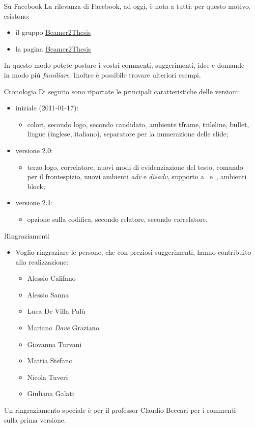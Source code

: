 \begin{tframe}{Su Facebook}
La rilevanza di Facebook, ad oggi, è nota a tutti: per questo motivo, esistono:
\begin{itemize}
\item il gruppo \href{https://www.facebook.com/\#!/groups/beamer2thesis/}{Beamer2Thesis}
\item la pagina \href{https://www.facebook.com/\#!/pages/Beamer2Thesis/112814205489099}{Beamer2Thesis}
\end{itemize} 
In questo modo potete postare i vostri commenti, suggerimenti, idee e domande in modo più \emph{familiare}. Inoltre è possibile trovare ulteriori esempi.
\end{tframe}

\begin{tframe}{Cronologia}
Di seguito sono riportate le principali caratteristiche delle versioni:
\begin{itemize}
\item iniziale (2011-01-17):
\begin{itemize}
\item colori, secondo logo, secondo candidato, ambiente tframe, titleline, bullet, lingue (inglese, italiano), separatore per la numerazione delle slide; 
\end{itemize}
\item versione 2.0:
\begin{itemize}
\item terzo logo, correlatore, nuovi modi di evidenziazione del testo, comando per il frontespizio, nuovi ambienti \emph{adv} e \emph{disadv}, supporto a \XeTeX\, e \XeLaTeX\,, ambienti block;
\end{itemize}
\item versione 2.1:
\begin{itemize}
\item opzione sulla codifica, secondo relatore, secondo correlatore.
\end{itemize}
\end{itemize}
\end{tframe}

\begin{tframe}{Ringraziamenti}
\begin{itemize}
\item Voglio ringraziare le persone, che con preziosi suggerimenti, hanno contribuito alla realizzazione:
\begin{itemize}
\item Alessio Califano
\item Alessio Sanna
\item Luca De Villa Palù
\item Mariano \emph{Dave} Graziano
\item Giovanna Turvani
\item Mattia Stefano
\item Nicola Tuveri
\item Giuliana Galati
\end{itemize}
\end{itemize}
Un ringraziamento speciale è per il professor Claudio Beccari per i commenti sulla prima versione.
\end{tframe}
